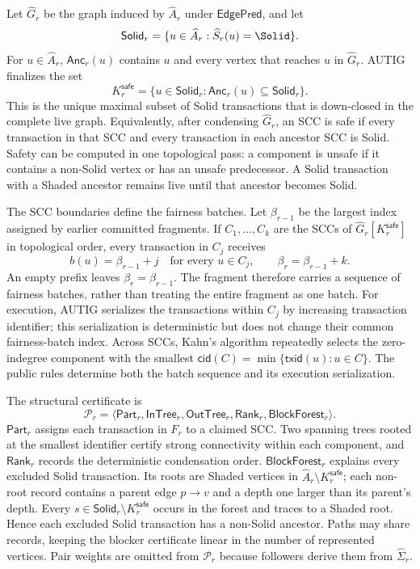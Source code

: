 Let $\widehat G_r$ be the graph induced by $\widehat A_r$ under
$\mathsf{EdgePred}$, and let
\[
 \mathsf{Solid}_r=\{u\in\widehat A_r:\widehat S_r(u)=\Solid\}.
\]
For $u\in\widehat A_r$, $\mathsf{Anc}_r(u)$ contains $u$ and every vertex
that reaches $u$ in $\widehat G_r$.  AUTIG finalizes the set
\[
 K_r^{\mathsf{safe}}
   =\{u\in\mathsf{Solid}_r:
          \mathsf{Anc}_r(u)\subseteq\mathsf{Solid}_r\}.
 \tag{11}\label{eq:safe-closure}
\]
This is the unique maximal subset of Solid transactions that is down-closed
in the complete live graph.  Equivalently, after condensing
$\widehat G_r$, an SCC is safe if every transaction in that SCC and every
transaction in each ancestor SCC is Solid.  Safety can be computed in one
topological pass: a component is unsafe if it contains a non-Solid vertex or
has an unsafe predecessor.  A Solid transaction with a Shaded ancestor
remains live until that ancestor becomes Solid.

The SCC boundaries define the fairness batches.  Let $\beta_{r-1}$ be the
largest index assigned by earlier committed fragments.  If
$C_1,\ldots,C_k$ are the SCCs of
$\widehat G_r[K_r^{\mathsf{safe}}]$ in topological order, every transaction in
$C_j$ receives
\[
 b(u)=\beta_{r-1}+j\quad\text{for every }u\in C_j,
 \qquad \beta_r=\beta_{r-1}+k.
\]
An empty prefix leaves $\beta_r=\beta_{r-1}$.  The fragment therefore carries
a sequence of fairness batches, rather than treating the entire fragment as
one batch.  For execution, AUTIG serializes the transactions within $C_j$ by
increasing transaction identifier; this serialization is deterministic but
does not change their common fairness-batch index.  Across SCCs, Kahn's
algorithm repeatedly selects the zero-indegree component with the smallest
$\mathsf{cid}(C)=\min\{\mathsf{txid}(u):u\in C\}$.  The public rules determine
both the batch sequence and its execution serialization.

The structural certificate is
\[
 \mathcal P_r=\langle\mathsf{Part}_r,\mathsf{InTree}_r,
 \mathsf{OutTree}_r,\mathsf{Rank}_r,\mathsf{BlockForest}_r\rangle.
 \tag{12}\label{eq:structural-proof}
\]
$\mathsf{Part}_r$ assigns each transaction in $F_r$ to a claimed SCC.  Two
spanning trees rooted at the smallest identifier certify strong connectivity
within each component, and $\mathsf{Rank}_r$ records the deterministic
condensation order.  $\mathsf{BlockForest}_r$ explains every excluded Solid
transaction.  Its roots are Shaded vertices in
$\widehat A_r\setminus K_r^{\mathsf{safe}}$; each non-root record contains a
parent edge $p\to v$ and a depth one larger than its parent's depth.  Every
$s\in\mathsf{Solid}_r\setminus K_r^{\mathsf{safe}}$ occurs in the forest and
traces to a Shaded root.  Hence each excluded Solid transaction has a
non-Solid ancestor.  Paths may share records, keeping the blocker certificate
linear in the number of represented vertices.  Pair weights are omitted from
$\mathcal P_r$ because followers derive them from $\widehat\Sigma_r$.

